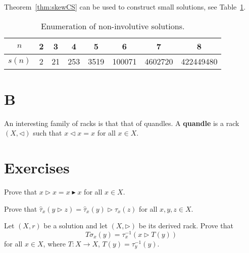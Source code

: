 Theorem~\ref{thm:skewCS} can be used to construct small solutions, see Table~\ref{tab:non_involutive}.

\begin{table}[H]
\centering
\caption{Enumeration of non-involutive solutions.}
\begin{tabular}{|c|ccccccc|}
\hline
$n$ & 2 & 3 & 4 & 5 & 6 & 7 & 8\tabularnewline
\hline
$s(n)$ & 2 & 21 & 253 & 3519 & 100071 & 4602720 & 422449480\tabularnewline
\hline
\end{tabular}
\label{tab:non_involutive}
\end{table}

\section*{B}

An interesting family of racks is that that of quandles. A \textbf{quandle} is a rack $(X,\triangleleft)$ 
such that $x\triangleleft x=x$ for all $x\in X$. 


\section*{Exercises}

\begin{prob}
    \label{prob:xx}
    Prove that $x\triangleright x=x\blacktriangleright x$ for all $x\in X$. 
\end{prob}

\begin{prob}
    \label{prob:tau_hat}
    Prove that $\widehat{\tau}_x(y\triangleright z)=\widehat{\tau}_x(y)\triangleright \widehat{\tau}_x(z)$ for all $x,y,z\in X$. 
\end{prob}

\begin{prob}
    \label{prob:variationT}
    Let $(X,r)$ be a solution and let $(X,\triangleright)$ be its derived rack. 
    Prove that 
    \[
    T\sigma_x(y)=\tau_x^{-1}(x\triangleright T(y))
    \]
    for all $x\in X$, where $T\colon X\to X$, $T(y)=\tau_y^{-1}(y)$. 
\end{prob}

